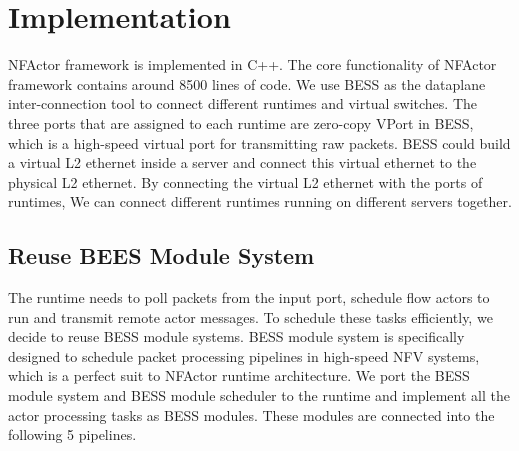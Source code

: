 \section{Implementation}
\label{sec:implementation}



NFActor framework is implemented in C++. The core functionality of NFActor framework contains around 8500 lines of code. We use BESS \cite{bess}\cite{2015} as the dataplane inter-connection tool to connect different runtimes and virtual switches. The three ports that are assigned to each runtime are zero-copy VPort in BESS, which is a high-speed virtual port for transmitting raw packets. BESS could build a virtual L2 ethernet inside a server and connect this virtual ethernet to the physical L2 ethernet. By connecting the virtual L2 ethernet with the ports of runtimes, We can connect different runtimes running on different servers together.

\subsection {Reuse BEES Module System}

The runtime needs to poll packets from the input port, schedule flow actors to run and transmit remote actor messages. To schedule these tasks efficiently, we decide to reuse BESS module systems. BESS module system is specifically designed to schedule packet processing pipelines in high-speed NFV systems, which is a perfect suit to NFActor runtime architecture. We port the BESS module system and BESS module scheduler to the runtime and implement all the actor processing tasks as BESS modules. These modules are connected into the following 5 pipelines.

